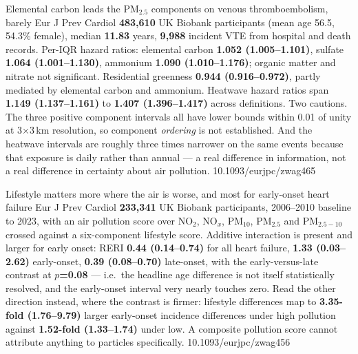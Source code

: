 \documentclass[10pt]{article}
\begin{document}

{Elemental carbon leads the PM$_{2.5}$ components on venous thromboembolism, barely}
{Eur J Prev Cardiol}
{\textbf{483{,}610} UK Biobank participants (mean age 56.5, 54.3\% female), median
\textbf{11.83} years, \textbf{9{,}988} incident VTE from hospital and death records.
Per-IQR hazard ratios: elemental carbon \textbf{1.052 (1.005--1.101)}, sulfate
\textbf{1.064 (1.001--1.130)}, ammonium \textbf{1.090 (1.010--1.176)}; organic matter and
nitrate not significant. Residential greenness \textbf{0.944 (0.916--0.972)}, partly
mediated by elemental carbon and ammonium. Heatwave hazard ratios span \textbf{1.149
(1.137--1.161)} to \textbf{1.407 (1.396--1.417)} across definitions. Two cautions. The
three positive component intervals all have lower bounds within 0.01 of unity at
3$\times$3\,km resolution, so component \emph{ordering} is not established. And the
heatwave intervals are roughly three times narrower on the same events because that
exposure is daily rather than annual --- a real difference in information, not a real
difference in certainty about air pollution.}
{10.1093/eurjpc/zwag465}

{Lifestyle matters more where the air is worse, and most for early-onset heart failure}
{Eur J Prev Cardiol}
{\textbf{233{,}341} UK Biobank participants, 2006--2010 baseline to 2023, with an air
pollution score over NO$_2$, NO$_x$, PM$_{10}$, PM$_{2.5}$ and PM$_{2.5-10}$ crossed
against a six-component lifestyle score. Additive interaction is present and larger for
early onset: RERI \textbf{0.44 (0.14--0.74)} for all heart failure, \textbf{1.33
(0.03--2.62)} early-onset, \textbf{0.39 (0.08--0.70)} late-onset, with the early-versus-late
contrast at \textbf{$p$=0.08} --- i.e.\ the headline age difference is not itself
statistically resolved, and the early-onset interval very nearly touches zero. Read the
other direction instead, where the contrast is firmer: lifestyle differences map to
\textbf{3.35-fold (1.76--9.79)} larger early-onset incidence differences under high
pollution against \textbf{1.52-fold (1.33--1.74)} under low. A composite pollution score
cannot attribute anything to particles specifically.}
{10.1093/eurjpc/zwag456}
\end{document}
